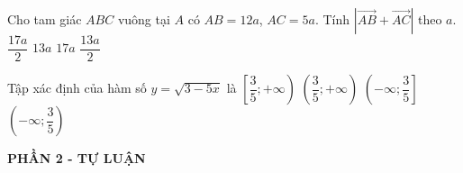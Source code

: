 \begin{ex}%
	Cho tam giác $A B C$ vuông tại $A$ có $A B=12a$, $AC=5 a$. Tính $|\overrightarrow{AB}+\overrightarrow{AC}|$ theo $a$.
	\choice
	{$\dfrac{17a}{2}$}
	{\True $13a$}
	{$17a$}
	{$\dfrac{13a}{2}$}
\end{ex}
\begin{ex}%
	Tập xác định của hàm số $y=\sqrt{3-5x}$ là
	\choice
	{$\left[\dfrac{3}{5} ;+\infty\right)$}
	{$\left(\dfrac{3}{5} ;+\infty\right)$}
	{\True $\left(-\infty ; \dfrac{3}{5}\right]$}
	{$\left(-\infty ; \dfrac{3}{5}\right)$}
\end{ex}


\begin{center}
	\textbf{PHẦN 2 - TỰ LUẬN}
\end{center}


